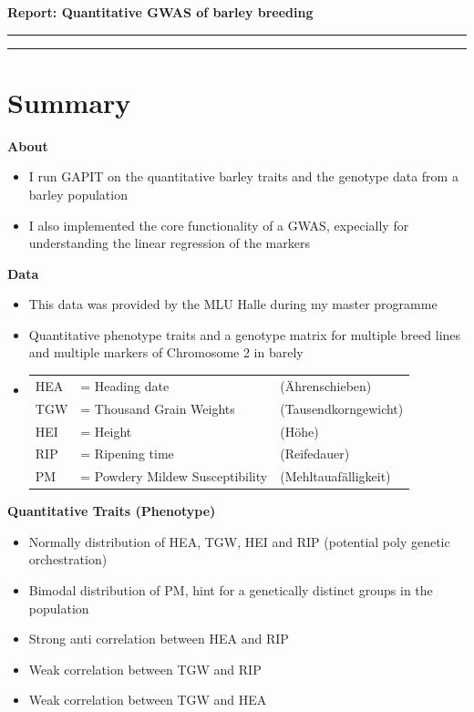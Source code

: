 \documentclass{article}
\def\spacing{\itemsep 0.0cm}
\begin{document}
	
	\begin{center}
		\LARGE
		\textbf{Report: Quantitative GWAS of barley breeding} \vspace{0.5cm}
		\hrule
	\end{center}
	
	\tableofcontents
	
	\bigskip\bigskip\hrule
	
	\section{Summary}
		
		\textbf{About}
		\begin{itemize}\spacing
			\item I run GAPIT on the quantitative barley traits and the genotype data from a barley population
			\item I also implemented the core functionality of a GWAS, expecially for understanding the linear regression of the markers
		\end{itemize}
		
		\textbf{Data}
		\begin{itemize}\spacing
			\item This data was provided by the MLU Halle during my master programme 
			\item Quantitative phenotype traits and a genotype matrix for multiple breed lines and multiple markers of Chromosome 2 in barely
			\item[] \begin{tabular}{lll}
					HEA &= Heading date                		&(Ährenschieben) \\
					TGW &= Thousand Grain Weights      		&(Tausendkorngewicht) \\
					HEI &= Height                      		&(Höhe) \\
					RIP &= Ripening time               		&(Reifedauer) \\
					PM  &= Powdery Mildew Susceptibility   	&(Mehltauafälligkeit)
					\end{tabular}
		\end{itemize}

		
		\textbf{Quantitative Traits (Phenotype)}
		\begin{itemize}\spacing
			\item Normally distribution of HEA, TGW, HEI and RIP (potential poly genetic orchestration)
			\item Bimodal distribution of PM, hint for a genetically distinct groups in the population 
			\item Strong anti correlation between HEA and RIP
			\item Weak correlation between TGW and RIP
			\item Weak correlation between TGW and HEA
		\end{itemize}
		
\end{document}
